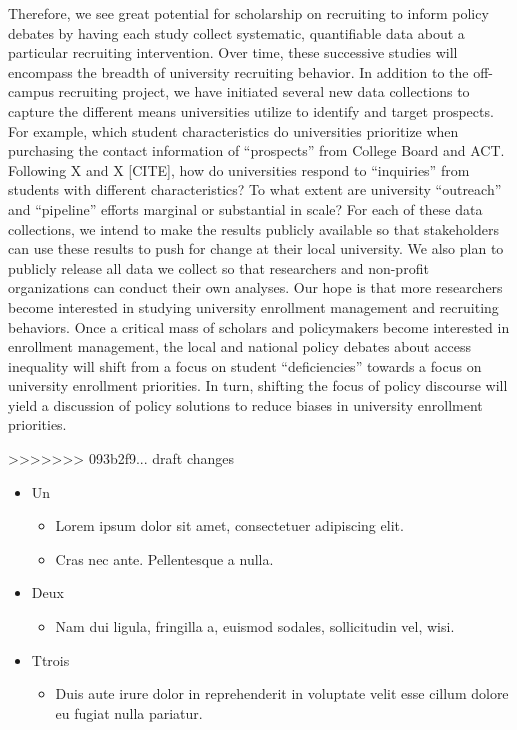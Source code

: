 \documentclass[twoside]{article}
\begin{document}
Therefore, we see great potential for scholarship on recruiting to inform policy debates by having each study collect systematic, quantifiable data about a particular recruiting intervention. Over time, these successive studies will encompass the breadth of university recruiting behavior.  In addition to the off-campus recruiting project, we have initiated several new data collections to capture the different means universities utilize to identify and target prospects.  For example, which student characteristics do universities prioritize when purchasing the contact information of ``prospects'' from College Board and ACT.  Following X and X [CITE], how do universities respond to ``inquiries'' from students with different characteristics? To what extent are university ``outreach'' and ``pipeline'' efforts marginal or substantial in scale? For each of these data collections, we intend to make the results publicly available so that stakeholders can use these results to push for change at their local university. We also plan to publicly release all data we collect so that researchers and non-profit organizations can conduct their own analyses.  Our hope is that more researchers become interested in studying university enrollment management and recruiting behaviors.  Once a critical mass of scholars and policymakers become interested in enrollment management, the local and national policy debates about access inequality will shift from a focus on student ``deficiencies'' towards a focus on university enrollment priorities.  In turn, shifting the focus of policy discourse will yield a discussion of policy solutions to reduce biases in university enrollment priorities.

>>>>>>> 093b2f9... draft changes

\begin{itemize}  %
	\item Un
	\begin{itemize}
		\item Lorem ipsum dolor sit amet, consectetuer adipiscing elit.
		\item Cras nec ante. Pellentesque a nulla.
	\end{itemize}
	\item Deux
	\begin{itemize}
		\item Nam dui ligula, fringilla a, euismod sodales, sollicitudin vel, wisi.
	\end{itemize}
	\item Ttrois
	\begin{itemize}
		\item Duis aute irure dolor in reprehenderit in voluptate velit esse cillum dolore eu fugiat nulla pariatur.
	\end{itemize}
	
\end{itemize} 
\end{document}
